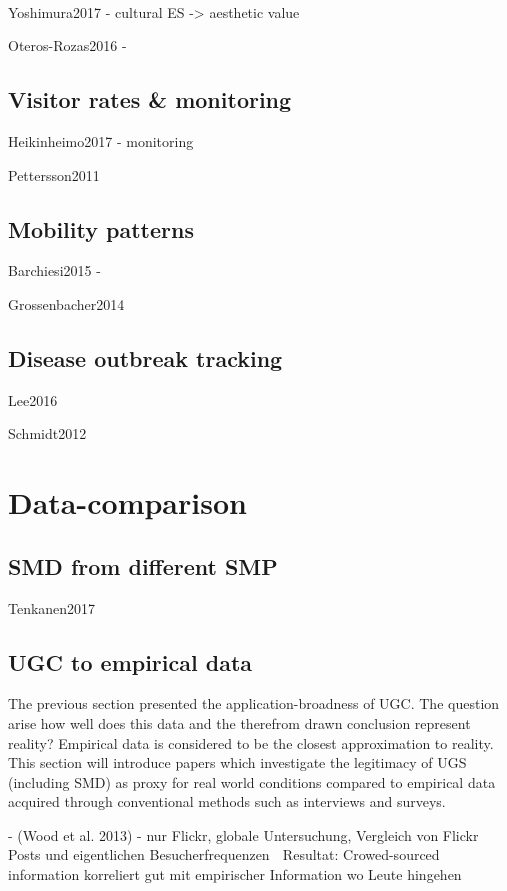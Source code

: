 \paragraph*{\textcite{Figueroa-Alfaro2017}}

Yoshimura2017 - cultural ES  -> aesthetic value

Oteros-Rozas2016 -

\subsection{Visitor rates \& monitoring }
Heikinheimo2017 - monitoring

Pettersson2011

\subsection{Mobility patterns}
Barchiesi2015 - 

Grossenbacher2014

\subsection{Disease outbreak tracking}
Lee2016

Schmidt2012



\section{Data-comparison}
\subsection{SMD from different SMP}
Tenkanen2017

\subsection{UGC to empirical data}
The previous section presented the application-broadness of UGC. The question arise how well does this data and the therefrom drawn conclusion represent reality? Empirical data is considered to be the closest approximation to reality. This section will introduce papers which investigate the legitimacy of UGS (including SMD) as proxy for real world conditions compared to empirical data acquired through conventional methods such as interviews and surveys.

- (Wood et al. 2013) - nur Flickr, globale Untersuchung, Vergleich von Flickr Posts und eigentlichen Besucherfrequenzen
 Resultat: Crowed-sourced information korreliert gut mit empirischer Information wo Leute hingehen

